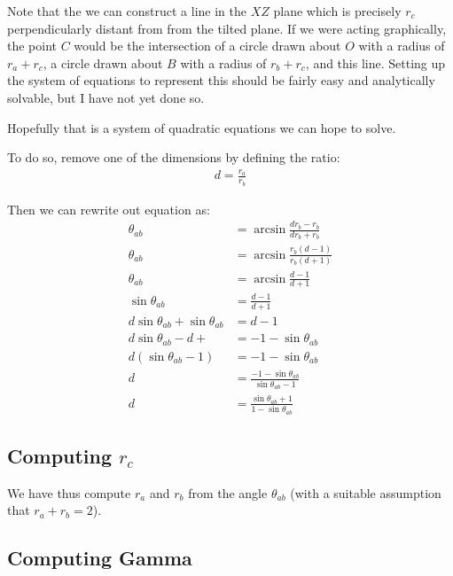 \documentclass{article}
\begin{document}
Note that the we can construct a line in the $XZ$ plane which is
precisely $r_c$ perpendicularly distant from from the tilted plane.
If we were acting graphically, the point $C$ would be the intersection
of a circle drawn about $O$ with a radius of $r_a+r_c$,
a circle drawn about $B$ with a radius of $r_b+r_c$, and this line.
Setting up the system of equations to represent this should be
fairly easy and analytically solvable, but I have not yet done so.


Hopefully that is a system of quadratic equations we
can hope to solve.





To do so, remove one of the dimensions by defining the ratio:
\begin{align}
d = \frac{r_a}{r_b}
\end{align}

Then we can rewrite out equation as:
\begin{align}
  \theta_{ab} &= \arcsin{\frac{d r_b - r_b}{d r_b + r_b}} \\
  \theta_{ab} &= \arcsin{\frac{r_b (d  - 1)}{r_b (d  + 1)}} \\
  \theta_{ab} &= \arcsin{\frac{d - 1}{d + 1}} \\
  \sin{\theta_{ab}} &= \frac{d - 1}{d + 1} \\
  d\sin{\theta_{ab}} + \sin{\theta_{ab}} &= d-1 \\
  d\sin{\theta_{ab}} -d +  &= -1 -\sin{\theta_{ab}} \\
  d(\sin{\theta_{ab}} -1)  &= -1 -\sin{\theta_{ab}} \\
  d &= \frac{-1 -\sin{\theta_{ab}}}{\sin{\theta_{ab}} -1} \\
  d &= \frac{\sin{\theta_{ab}} + 1}{1 - \sin{\theta_{ab}}}
\end{align}






\subsection{Computing $r_c$}

We have thus compute $r_a$ and $r_b$ from the angle $\theta_{ab}$ (with a suitable assumption that $r_a+r_b=2$).


\subsection{Computing Gamma}
\end{document}
